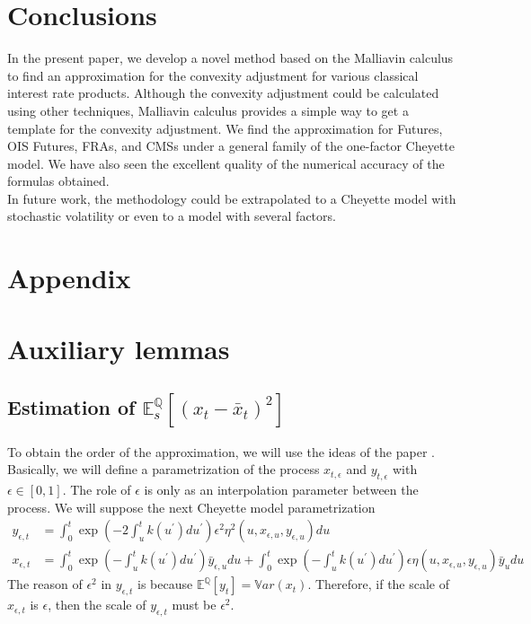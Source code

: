 \documentclass[a4paper,10pt]{article}
\newcommand{\1}{\mathbf{1}}
\begin{document}
\section{Conclusions}\label{sec:Conclusion}
In the present paper, we develop a novel method based on the Malliavin calculus to find an approximation for the convexity adjustment for various classical interest rate products. Although the convexity adjustment could be calculated using other techniques, Malliavin calculus provides a simple way to get a template for the convexity adjustment. We find the approximation for Futures, OIS Futures, FRAs, and CMSs under a general family of the one-factor Cheyette model. We have also seen the excellent quality of the numerical accuracy of the formulas obtained.\\

In future work, the methodology could be extrapolated to a Cheyette model with stochastic volatility or even to a model with several factors.


\section*{Appendix}
\appendix
\renewcommand{\thesection}{\Alph{section}.\arabic{section}}




\section{Auxiliary lemmas}
\subsection{Estimation of $\mathbb{E}_s^{\mathbb{Q}}\left[(x_t - \bar{x}_{t})^{2}\right]$}\label{estimation_error_l2}
To obtain the order of the approximation, we will use the ideas of the paper \cite{B-G-M-2008}. Basically, we will define a parametrization of the process $x_{t,\epsilon}$ and $y_{t,\epsilon}$ with $\epsilon \in [0,1]$. The role of $\epsilon$ is only as an interpolation parameter between the process. We will suppose the next Cheyette model parametrization
\begin{align}\label{parametric_process}
y_{\epsilon,t} &= \int_{0}^{t} \exp\left(-2 \int_{u}^{t} k(u^{\prime}) du^{\prime}\right) \epsilon^{2} \eta^{2}(u,x_{\epsilon,u},y_{\epsilon,u}) du \\
x_{\epsilon, t} &= \int_{0}^{t} \exp\left(-\int_{u}^{t} k(u^{\prime}) du^{\prime}\right) \bar{y}_{\epsilon,u} du + \int_{0}^{t} \exp\left(-\int_{u}^{t} k(u^{\prime}) du^{\prime}\right) \epsilon \eta(u,x_{\epsilon,u},y_{\epsilon,u})  \bar{y}_u du
\end{align}
The reason of $\epsilon^{2}$ in $y_{\epsilon,t}$ is because $\mathbb{E}^{\mathbb{Q}}\left[y_t\right]= \mathbb{V}ar(x_t)$. Therefore, if the scale of $x_{\epsilon,t}$ is $\epsilon$, then the scale of $y_{\epsilon,t}$ must be $\epsilon^{2}$.\\
\end{document}
